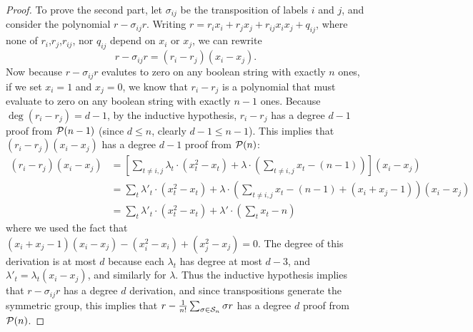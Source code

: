 \begin{proof}
To prove the second part, let $\sigma_{ij}$ be the transposition of labels $i$ and $j$, and consider the polynomial $r - \sigma_{ij}r$. Writing $r = r_ix_i + r_jx_j + r_{ij}x_ix_j + q_{ij}$, where none of $r_i$,$r_j$,$r_{ij}$, nor $q_{ij}$ depend on $x_i$ or $x_j$, we can rewrite
\[r - \sigma_{ij}r = (r_i - r_j)(x_i - x_j).\]
Now because $r - \sigma_{ij}r$ evalutes to zero on any boolean string with exactly $n$ ones, if we set $x_i = 1$ and $x_j = 0$, we know that $r_i - r_j$ is a polynomial that must evaluate to zero on any boolean string with exactly $n-1$ ones. Because $\deg (r_i - r_j) = d-1$, by the inductive hypothesis, $r_i - r_j$ has a degree $d-1$ proof from $\mathcal P(n-1)$ (since $d \leq n$, clearly $d-1 \leq n-1$). This implies that $(r_i - r_j)(x_i - x_j)$ has a degree $d-1$ proof from $\mathcal P(n)$:
\begin{align*}
(r_i - r_j)(x_i - x_j) &= \left[\sum_{t \neq i,j} \lambda_t\cdot (x_t^2 - x_t) + \lambda \cdot \left(\sum_{t \neq i,j} x_t - (n-1)\right)\right](x_i - x_j) \\
&= \sum_{t} \lambda'_t \cdot (x_t^2 - x_t) + \lambda \cdot \left(\sum_{t \neq i,j} x_t - (n-1) + (x_i + x_j - 1)\right)(x_i - x_j)\\
&= \sum_t \lambda'_t \cdot (x_t^2 - x_t) +\lambda' \cdot \left(\sum_t x_t - n\right)
\end{align*}
where we used the fact that $(x_i + x_j - 1)(x_i - x_j) - (x_i^2 - x_i) + (x_j^2 - x_j) = 0$. The degree of this derivation is at most $d$ because each $\lambda_t$ has degree at most $d-3$, and $\lambda'_t = \lambda_t(x_i - x_j)$, and similarly for $\lambda$. Thus the inductive hypothesis implies that $r - \sigma_{ij}r$ has a degree $d$ derivation, and since transpositions generate the symmetric group, this implies that $r - \frac{1}{n!}\sum_{\sigma \in \mathcal S_n} \sigma r$ has a degree $d$ proof from $\mathcal P(n)$.
\end{proof}

